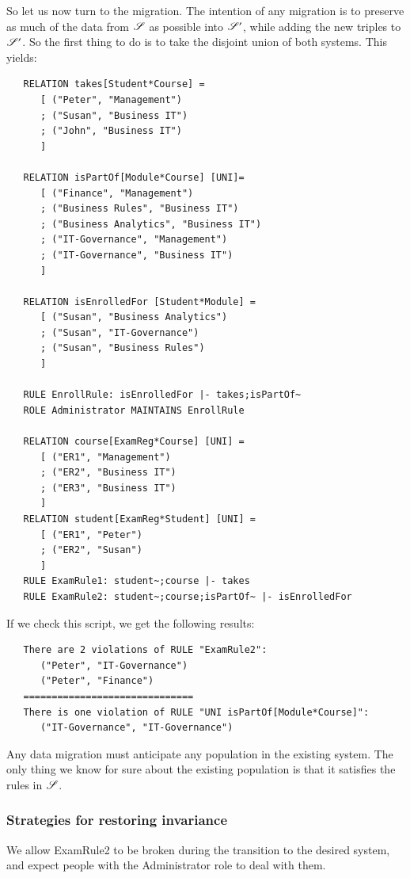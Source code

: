 \documentclass{elsarticle}
\begin{document}
   So let us now turn to the migration.
   The intention of any migration is to preserve as much of the data from $\mathscr{S}$ as possible into $\mathscr{S}'$,
   while adding the new triples to $\mathscr{S}'$.
   So the first thing to do is to take the disjoint union of both systems.
   This yields:
\begin{verbatim}
   RELATION takes[Student*Course] =
      [ ("Peter", "Management")
      ; ("Susan", "Business IT")
      ; ("John", "Business IT")
      ]
   
   RELATION isPartOf[Module*Course] [UNI]=
      [ ("Finance", "Management")
      ; ("Business Rules", "Business IT")
      ; ("Business Analytics", "Business IT")
      ; ("IT-Governance", "Management")
      ; ("IT-Governance", "Business IT")
      ]
   
   RELATION isEnrolledFor [Student*Module] =
      [ ("Susan", "Business Analytics")
      ; ("Susan", "IT-Governance")
      ; ("Susan", "Business Rules")
      ]
   
   RULE EnrollRule: isEnrolledFor |- takes;isPartOf~
   ROLE Administrator MAINTAINS EnrollRule
   
   RELATION course[ExamReg*Course] [UNI] =
      [ ("ER1", "Management")
      ; ("ER2", "Business IT")
      ; ("ER3", "Business IT")
      ]
   RELATION student[ExamReg*Student] [UNI] =
      [ ("ER1", "Peter")
      ; ("ER2", "Susan")
      ]
   RULE ExamRule1: student~;course |- takes
   RULE ExamRule2: student~;course;isPartOf~ |- isEnrolledFor
\end{verbatim}
   If we check this script, we get the following results:
\begin{verbatim}
   There are 2 violations of RULE "ExamRule2":
      ("Peter", "IT-Governance")
      ("Peter", "Finance")
   ==============================
   There is one violation of RULE "UNI isPartOf[Module*Course]":
      ("IT-Governance", "IT-Governance")
\end{verbatim}
   Any data migration must anticipate any population in the existing system.
   The only thing we know for sure about the existing population is that it satisfies the rules in $\mathscr{S}$.

\subsubsection{Strategies for restoring invariance}

We allow ExamRule2 to be broken during the transition to the desired system, and expect people with the Administrator role to deal with them.
\end{document}

